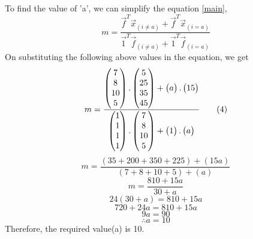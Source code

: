 \documentclass[journal,12pt,twocolumn]{IEEEtran}
\begin{document}
To find the value of 'a', we can simplify the equation \eqref{main},
\begin{equation}
		m = \frac{\vec{f}^T\vec{x}_{(i\neq a)} + \vec{f}^T\vec{x}_{(i=a)}}{\vec{1}^T\vec{f}_{(i\neq a)} + \vec{1}^T\vec{f}_{(i=a)}}\tag{3}
\end{equation}
On substituting the following above values in the equation, we get
\begin{equation}
	m = \frac{\begin{pmatrix}7\\8\\10\\5\end{pmatrix}.\begin{pmatrix}5\\25\\35\\45\end{pmatrix} + \begin{pmatrix}a\end{pmatrix}.\begin{pmatrix}15\end{pmatrix}}{\begin{pmatrix}1\\1\\1\\1\end{pmatrix}.\begin{pmatrix}7\\8\\10\\5\end{pmatrix} + \begin{pmatrix}1\end{pmatrix}.\begin{pmatrix}a\end{pmatrix}}\tag{4}
\end{equation}
\begin{equation}
	m = \frac{(35 + 200 + 350 + 225) + (15a)}{(7 + 8 + 10 + 5) + (a)} \tag{5}
\end{equation}
\begin{equation}
	m = \frac{810 + 15a}{30 + a} \tag{6}
\end{equation}
	\begin{equation}
		24(30 + a) = 810 + 15a \tag{7}
	\end{equation}
	\begin{equation}
		720 + 24a = 810 + 15a \tag{8}
	\end{equation}
	\begin{equation}
		9a = 90 \tag{9}
	\end{equation}
	\begin{equation}
		\therefore a = 10 \tag{10}
	\end{equation}
	Therefore, the required value(a) is 10.
\end{document}
